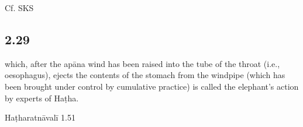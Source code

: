\begin{ekdosis}
\begin{testimonia}[hp02_028]
\begin{versinnote}
\end{versinnote}

Cf. SKS

\begin{versinnote}
\end{versinnote}
\end{testimonia}

\begin{philcomm}[hp02_028]
\end{philcomm}

\subsection*{2.29}
\begin{translation} which, after the apāna wind has been raised into the tube of the throat (i.e., oesophagus), ejects the contents of the stomach from the windpipe (which has been brought under control by cumulative practice) is called the elephant’s action by experts of Haṭha.
\end{translation}

\begin{sources}[hp02_029]
\end{sources}

\begin{testimonia}[hp02_029]
Haṭharatnāvalī 1.51

\begin{versinnote}
\end{versinnote}


\end{testimonia}
\end{ekdosis}
